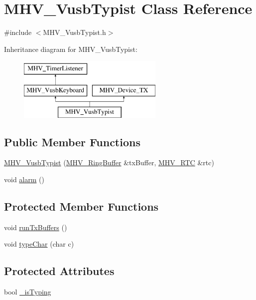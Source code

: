 \hypertarget{class_m_h_v___vusb_typist}{
\section{\-M\-H\-V\-\_\-\-Vusb\-Typist \-Class \-Reference}
\label{class_m_h_v___vusb_typist}
}


{\ttfamily \#include $<$\-M\-H\-V\-\_\-\-Vusb\-Typist.\-h$>$}

\-Inheritance diagram for \-M\-H\-V\-\_\-\-Vusb\-Typist\-:\begin{figure}[H]
\begin{center}
\leavevmode
\includegraphics[height=3.000000cm]{class_m_h_v___vusb_typist}
\end{center}
\end{figure}
\subsection*{\-Public \-Member \-Functions}
\begin{DoxyCompactItemize}
\item 
\hyperlink{class_m_h_v___vusb_typist_abec936c0ca44586fec7bd76430feac71}{\-M\-H\-V\-\_\-\-Vusb\-Typist} (\hyperlink{class_m_h_v___ring_buffer}{\-M\-H\-V\-\_\-\-Ring\-Buffer} \&tx\-Buffer, \hyperlink{class_m_h_v___r_t_c}{\-M\-H\-V\-\_\-\-R\-T\-C} \&rtc)
\item 
void \hyperlink{class_m_h_v___vusb_typist_a90c805aafa38fb78df184c26fd4e0967}{alarm} ()
\end{DoxyCompactItemize}
\subsection*{\-Protected \-Member \-Functions}
\begin{DoxyCompactItemize}
\item 
void \hyperlink{class_m_h_v___vusb_typist_a171cec2829ab07c838ffda3e7c3b9871}{run\-Tx\-Buffers} ()
\item 
void \hyperlink{class_m_h_v___vusb_typist_a20f527471b7f3a907d3969eaf4a04689}{type\-Char} (char c)
\end{DoxyCompactItemize}
\subsection*{\-Protected \-Attributes}
\begin{DoxyCompactItemize}
\item 
bool \hyperlink{class_m_h_v___vusb_typist_a4c6b10764e87d062ec4fd70007959175}{\-\_\-is\-Typing}
\end{DoxyCompactItemize}


